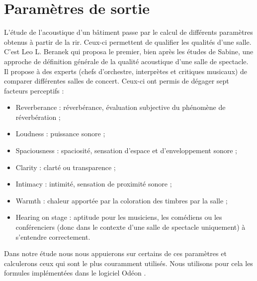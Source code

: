 \section{Paramètres de sortie} \label{sect_data}
L'étude de l'acoustique d'un bâtiment passe par le calcul de différents paramètres obtenus à partir de la \gls{rir}. Ceux-ci permettent de qualifier les qualités d'une salle. C'est Leo L. Beranek qui proposa le premier, bien après les études de Sabine, une approche de définition générale de la qualité acoustique d'une salle de spectacle. Il propose à des experts (chefs d’orchestre, interprètes et critiques musicaux) de comparer différentes salles de concert. Ceux-ci ont permis de dégager sept facteurs perceptifs :
\begin{itemize}
	\item Reverberance : réverbérance, évaluation subjective du phénomène de réverbération ;
	\item Loudness : puissance sonore ;
	\item Spaciousness : spaciosité, sensation d'espace et d'enveloppement sonore ;
	\item Clarity : clarté ou transparence ;
	\item Intimacy : intimité, sensation de proximité sonore ;
	\item Warmth : chaleur apportée par la coloration des timbres par la salle ;
	\item Hearing on stage : aptitude pour les musiciens, les comédiens ou les conférenciers (donc dans le contexte d'une salle de spectacle uniquement) à s'entendre correctement. 
\end{itemize}

Dans notre étude nous nous appuierons sur certains de ces paramètres et calculerons ceux qui sont le plus couramment utilisés. Nous utilisons pour cela les formules implémentées dans le logiciel Odéon \cite[p.87-92]{odeonManuel}.%

